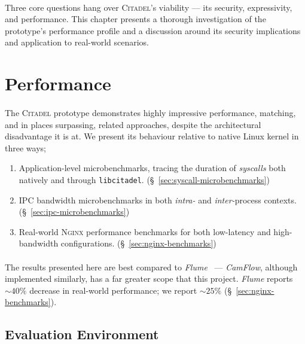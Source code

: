 \paragraph{} Three core questions hang over \textsc{Citadel}'s viability --- its security, expressivity, and performance. This chapter presents a thorough investigation of the prototype's performance profile and a discussion around its security implications and application to real-world scenarios.

\section{Performance}
\label{sec:performance}

\paragraph{} The \textsc{Citadel} prototype demonstrates highly impressive performance, matching, and in places surpassing, related approaches, despite the architectural disadvantage it is at. We present its behaviour relative to native Linux kernel in three ways;

\begin{enumerate}
    \item Application-level microbenchmarks, tracing the duration of \textit{syscalls} both natively and through \texttt{libcitadel}. (§~\ref{sec:syscall-microbenchmarks})
    \item IPC bandwidth microbenchmarks in both \textit{intra-} and \textit{inter-}process contexts. (§~\ref{sec:ipc-microbenchmarks})
    \item Real-world \textsc{Nginx} performance benchmarks for both low-latency and high-bandwidth configurations. (§~\ref{sec:nginx-benchmarks})
\end{enumerate}

\paragraph{}The results presented here are best compared to \textit{Flume}~\cite{flume} --- \textit{CamFlow}, although implemented similarly, has a far greater scope that this project. \textit{Flume} reports $\sim 40\%$ decrease in real-world performance; we report $\sim 25\%$ (§~\ref{sec:nginx-benchmarks}).

\subsection{Evaluation Environment}
